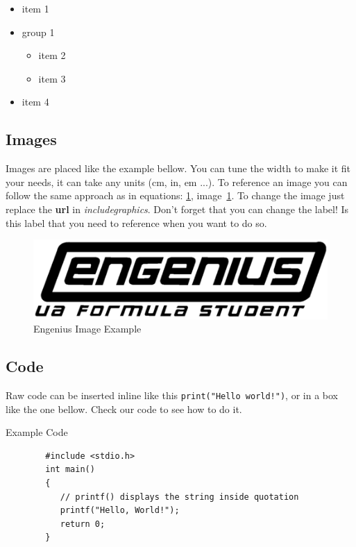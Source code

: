 \begin{itemize}
    \item item 1
    \item group 1
    \begin{itemize}
        \item item 2
        \item item 3
    \end{itemize}
    \item item 4
\end{itemize}


\subsection{Images}

Images are placed like the example bellow. You can tune the width to make it fit your needs, it can take any units (cm, in, em ...). To reference an image you can follow the same approach as in equations: \texttt{\ref{img:engeniuslogo}}, image~\ref{img:engeniuslogo}.
To change the image just replace the \textbf{url} in \textit{includegraphics}. Don't forget that you can change the label! Is this label that you need to reference when you want to do so.

\begin{figure}[H]
    \begin{center}
        \includegraphics[width=\textwidth/3]{assets/engeniusLogo.png}
        \caption{Engenius Image Example}
        \label{img:engeniuslogo}
    \end{center}
\end{figure}

\subsection{Code}

Raw code can be inserted inline like this \texttt{print("Hello world!")}, or in a box like the one bellow. Check our code to see how to do it.

\begin{codebox}{Example Code}
    \begin{verbatim}
        #include <stdio.h>
        int main()
        {
           // printf() displays the string inside quotation
           printf("Hello, World!");
           return 0;
        }
    \end{verbatim}
\end{codebox}

